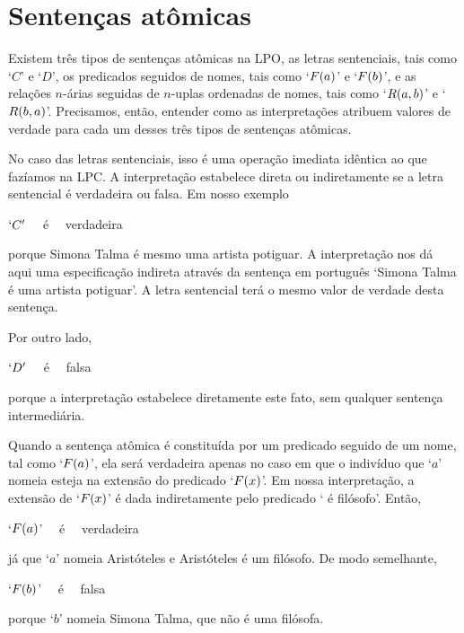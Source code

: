 \section{Sentenças atômicas}
Existem três tipos de sentenças atômicas na LPO, as letras sentenciais, tais como `$C$' e `$D$', os predicados seguidos de nomes, tais como  `$\mathord{F}(a)$' e `$\mathord{F}(b)$', e as relações $n$-árias seguidas de $n$-uplas ordenadas de nomes, tais como `$\mathord{R}(a,b)$' e `$\mathord{R}(b,a)$'.
Precisamos, então, entender como as interpretações atribuem valores de verdade para cada um desses três tipos de sentenças atômicas.

No caso das letras sentenciais, isso é uma operação imediata idêntica ao que fazíamos na LPC.
A interpretação estabelece direta ou indiretamente se a letra sentencial é verdadeira ou falsa.
Em nosso exemplo
\begin{center}
	$`C'$ \ \ é \ \ verdadeira   
\end{center}
porque Simona Talma é mesmo uma artista potiguar.
A interpretação nos dá aqui uma especificação indireta através da sentença em português `Simona Talma é uma artista potiguar'.
A letra sentencial terá o mesmo valor de verdade desta sentença.

Por outro lado,
\begin{center}
	$`D'$ \ \ é \ \ falsa   
\end{center}
porque a interpretação estabelece diretamente este fato, sem qualquer sentença intermediária.

Quando a sentença atômica é constituída por um predicado seguido de um nome, tal como `$\mathord{F}(a)$', ela será verdadeira apenas no caso em que o indivíduo que `$a$' nomeia esteja na extensão do predicado `$\mathord{F}(x)$'.
Em nossa interpretação, a extensão de `$\mathord{F}(x)$' é dada indiretamente pelo predicado ` é filósofo'.
Então,
\begin{center}
	`$\mathord{F}(a)$' \ \ é \ \ verdadeira
\end{center}
já que `$a$' nomeia Aristóteles e Aristóteles é um filósofo.
De modo semelhante,
\begin{center}
	`$\mathord{F}(b)$' \ \ é \ \ falsa
\end{center}
porque `$b$' nomeia Simona Talma, que não é uma filósofa.

